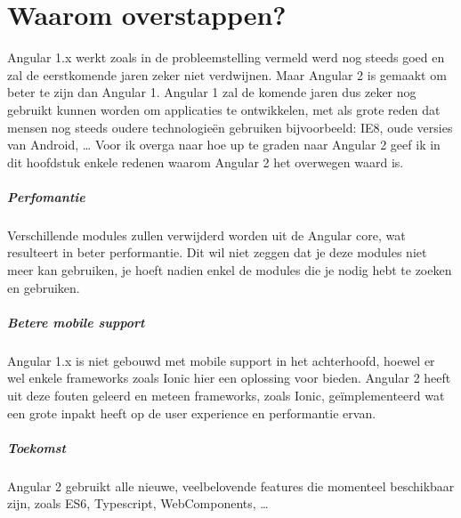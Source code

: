 \documentclass[pdftex,a4paper,12pt,twoside]{report}
\begin{document}
\chapter{Waarom overstappen?}
\label{ch:waarom}

Angular 1.x werkt zoals in de probleemstelling vermeld werd nog steeds goed en zal de eerstkomende jaren zeker niet verdwijnen. Maar Angular 2 is gemaakt om beter te zijn dan Angular 1. Angular 1 zal de komende jaren dus zeker nog gebruikt kunnen worden om applicaties te ontwikkelen, met als grote reden dat mensen nog steeds oudere technologie\"en gebruiken bijvoorbeeld: IE8, oude versies van Android, \ldots
\newline
\newline
Voor ik overga naar hoe up te graden naar Angular 2 geef ik in dit hoofdstuk enkele redenen waarom Angular 2 het overwegen waard is. 

\paragraph{Perfomantie} 
Verschillende modules zullen verwijderd worden uit de Angular core, wat resulteert in beter performantie. Dit wil niet zeggen dat je deze modules niet meer kan gebruiken, je hoeft nadien enkel de modules die je nodig hebt te zoeken en gebruiken.
\par

\paragraph{Betere mobile support}
Angular 1.x is niet gebouwd met mobile support in het achterhoofd, hoewel er wel enkele frameworks zoals Ionic hier een oplossing voor bieden. Angular 2 heeft uit deze fouten geleerd en meteen frameworks, zoals Ionic, ge\"implementeerd wat een grote inpakt heeft op de user experience en performantie ervan. 
\par

\paragraph{Toekomst} 
Angular 2 gebruikt alle nieuwe, veelbelovende features die momenteel beschikbaar zijn, zoals ES6, Typescript, WebComponents, \ldots
\par
\end{document}

